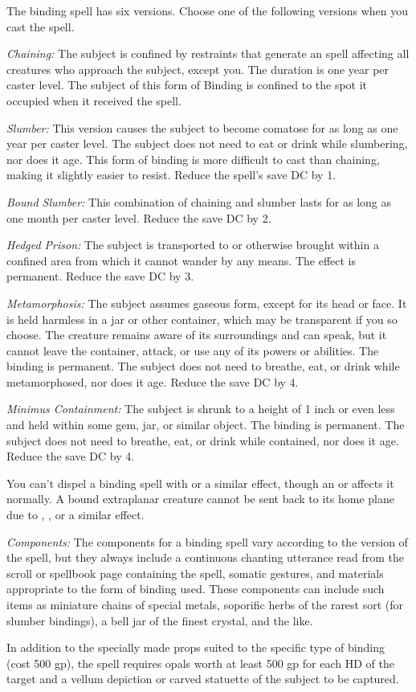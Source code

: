 The binding spell has six versions. Choose one of the following versions 
when you cast the spell.

\textit{Chaining:} The subject is confined by restraints that generate an 
spell affecting all creatures who approach the subject, except you. The duration 
is one year per caster level. The subject of this form of Binding is confined 
to the spot it occupied when it received the spell.

\textit{Slumber:} This version causes the subject to become comatose for as long 
as one year per caster level. The subject does not need to eat or drink while slumbering, 
nor does it age. This form of binding is more difficult to cast than chaining, 
making it slightly easier to resist. Reduce the spell's save DC by 1.

\textit{Bound Slumber:} This combination of chaining and slumber 
lasts for as long as one month per caster level. Reduce the save DC by 2.

\textit{Hedged Prison:} The subject is transported to or otherwise brought within 
a confined area from which it cannot wander by any means. The effect is permanent. 
Reduce the save DC by 3.

\textit{Metamorphosis:} The subject assumes gaseous form, except for its head or 
face. It is held harmless in a jar or other container, which may be transparent 
if you so choose. The creature remains aware of its surroundings and can speak, 
but it cannot leave the container, attack, or use any of its powers or abilities. 
The binding is permanent. The subject does not need to breathe, eat, or 
drink while metamorphosed, nor does it age. Reduce the save DC by 4.

\textit{Minimus Containment:} The subject is shrunk to a height of 1 inch or even 
less and held within some gem, jar, or similar object. The binding is 
permanent. The subject does not need to breathe, eat, or drink while contained, 
nor does it age. Reduce the save DC by 4.

You can't dispel a binding spell with  or a similar 
effect, though an  or  affects 
it normally. A bound extraplanar creature cannot be sent back to its home plane 
due to , , or a similar effect.

\textit{Components:} The components for a binding spell vary according 
to the version of the spell, but they always include a continuous chanting utterance 
read from the scroll or spellbook page containing the spell, somatic gestures, 
and materials appropriate to the form of binding used. These components 
can include such items as miniature chains of special metals, soporific herbs of 
the rarest sort (for slumber bindings), a bell jar of the finest crystal, 
and the like.

In addition to the specially made props suited to the specific type of binding (cost 500 gp), the spell requires opals worth at least 500 gp for each HD of the 
target and a vellum depiction or carved statuette of the subject to be captured.

